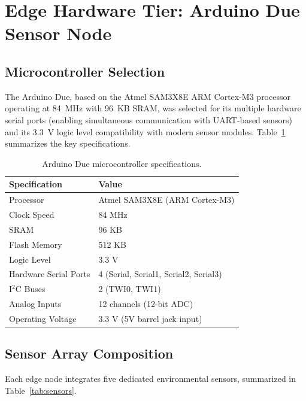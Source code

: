 \documentclass[12pt,a4paper]{article}
\begin{document}
\section{Edge Hardware Tier: Arduino Due Sensor Node}

\subsection{Microcontroller Selection}
The Arduino Due, based on the Atmel SAM3X8E ARM Cortex-M3 processor operating at 84~MHz with 96~KB SRAM, was selected for its multiple hardware serial ports (enabling simultaneous communication with UART-based sensors) and its 3.3~V logic level compatibility with modern sensor modules. Table~\ref{tab:mcu} summarizes the key specifications.

\begin{table}[H]
\centering
\caption{Arduino Due microcontroller specifications.}
\label{tab:mcu}
\begin{tabular}{@{}ll@{}}
\toprule
\textbf{Specification} & \textbf{Value} \\
\midrule
Processor & Atmel SAM3X8E (ARM Cortex-M3) \\
Clock Speed & 84 MHz \\
SRAM & 96 KB \\
Flash Memory & 512 KB \\
Logic Level & 3.3 V \\
Hardware Serial Ports & 4 (Serial, Serial1, Serial2, Serial3) \\
I$^2$C Buses & 2 (TWI0, TWI1) \\
Analog Inputs & 12 channels (12-bit ADC) \\
Operating Voltage & 3.3 V (5V barrel jack input) \\
\bottomrule
\end{tabular}
\end{table}

\subsection{Sensor Array Composition}
Each edge node integrates five dedicated environmental sensors, summarized in Table~\ref{tab:sensors}.
\end{document}
